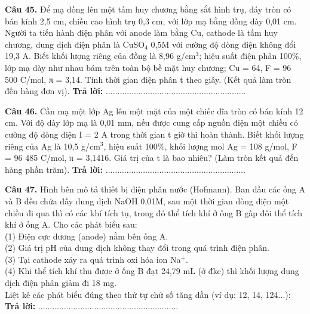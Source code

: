 \documentclass{article}
\begin{document}
\fontsize{24}{32}\selectfont
\textbf{Câu 45.} Để mạ đồng lên một tấm huy chương bằng sắt hình trụ, đáy tròn có bán kính 2,5 cm, chiều cao hình trụ 0,3 cm, với lớp mạ bằng đồng dày 0,01 cm. Người ta tiến hành điện phân với anode làm bằng Cu, cathode là tấm huy chương, dung dịch điện phân là CuSO$_{\text{4}}$ 0,5M với cường độ dòng điện không đổi 19,3 A. Biết khối lượng riêng của đồng là 8,96 g/cm$^{\text{3}}$; hiệu suất điện phân 100\%, lớp mạ dày như nhau bám trên toàn bộ bề mặt huy chương; Cu = 64, F = 96 500 C/mol, π = 3,14. Tính thời gian điện phân t theo giây. (Kết quả làm tròn đến hàng đơn vị).
\vspace{12pt}
\textbf{Trả lời:} $\dots\dots\dots\dots\dots\dots\dots\dots\dots\dots\dots\dots\dots\dots\dots\dots\dots\dots\dots\dots$
\vspace*{\fill}
\newpage

\fontsize{24}{32}\selectfont
\textbf{Câu 46.} Cần mạ một lớp Ag lên một mặt của một chiếc đĩa tròn có bán kính 12 cm. Với độ dày lớp mạ là 0,01 mm, nếu được cung cấp nguồn điện một chiều có cường độ dòng điện I = 2 A trong thời gian t giờ thì hoàn thành. Biết khối lượng riêng của Ag là 10,5 g/cm$^{\text{3}}$, hiệu suất 100\%, khối lượng mol Ag = 108 g/mol, F = 96 485 C/mol, π = 3,1416. Giá trị của t là bao nhiêu? (Làm tròn kết quả đến hàng phần trăm).
\vspace{12pt}
\textbf{Trả lời:} $\dots\dots\dots\dots\dots\dots\dots\dots\dots\dots\dots\dots\dots\dots\dots\dots\dots\dots\dots\dots$
\vspace*{\fill}
\newpage

\fontsize{24}{32}\selectfont
\textbf{Câu 47.} Hình bên mô tả thiết bị điện phân nước (Hofmann). Ban đầu các ống A và B đều chứa đầy dung dịch NaOH 0,01M, sau một thời gian dòng điện một chiều đi qua thì có các khí tích tụ, trong đó thể tích khí ở ống B gấp đôi thể tích khí ở ống A. Cho các phát biểu sau:\\ 
(1) Điện cực dương (anode) nằm bên ống A.\\ 
(2) Giá trị pH của dung dịch không thay đổi trong quá trình điện phân.\\ 
(3) Tại cathode xảy ra quá trình oxi hóa ion Na$^{\text{+}}$.\\ 
(4) Khi thể tích khí thu được ở ống B đạt 24,79 mL (ở đkc) thì khối lượng dung dịch điện phân giảm đi 18 mg.\\ 
Liệt kê các phát biểu đúng theo thứ tự chữ số tăng dần (ví dụ: 12, 14, 124...):
\vspace{12pt}
\textbf{Trả lời:} $\dots\dots\dots\dots\dots\dots\dots\dots\dots\dots\dots\dots\dots\dots\dots\dots\dots\dots\dots\dots$
\vspace*{\fill}
\newpage
\end{document}
